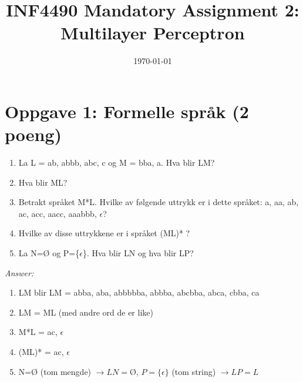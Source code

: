 \documentclass[a4paper, 12pt,]{article}             %
\title{\vspace{-2cm}INF4490 Mandatory Assignment 2:\\
  Multilayer Perceptron}
\date{\today}
\begin{document}
\renewcommand\marginsymbol[1][0pt]{%
  \tabto*{0cm}\makebox[-1cm][c]{$mathbb{P}$}\tabto*{\TabPrevPos}}

\maketitle

  
\section*{Oppgave 1: Formelle språk (2 poeng)}
\begin{enumerate}
  \item La L = {ab, abbb, abc, c} og M = {bba, a}. Hva blir LM? 
  \item Hva blir ML? 
  \item Betrakt språket M*L. Hvilke av følgende uttrykk er i dette språket: a, aa, ab, ac, acc, aacc, 
    aaabbb, $\epsilon$?
  \item Hvilke av disse uttrykkene er i språket (ML)* ?
  \item La N=Ø og P=\{$\epsilon$\}. Hva blir LN og hva blir LP? 
  \end{enumerate}

\textit{Answer:}

\begin{enumerate}
\item LM blir LM = {abba, aba, abbbbba, abbba, abcbba, abca, cbba, ca}
\item LM = ML (med andre ord de er like)
\item M*L = {ac, \ensuremath{\epsilon}}
\item (ML)* = {ac, \ensuremath{\epsilon}}
\item N=Ø (tom mengde) \ensuremath{\rightarrow LN = Ø}, \ensuremath{P=\{\epsilon\}} (tom string) \ensuremath{\rightarrow LP = L}  
\end{enumerate}
\end{document}
